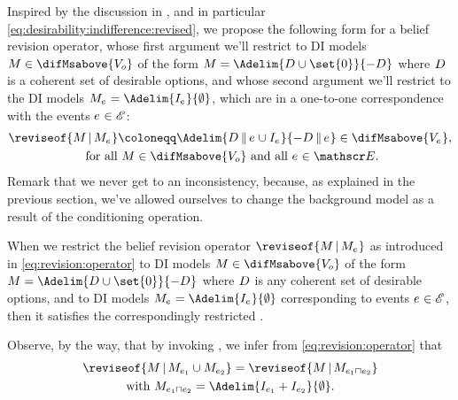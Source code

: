 \documentclass[preprint]{isipta2025}
\begin{document}
Inspired by the discussion in , and in particular \cref{eq:desirability:indifference:revised}, we propose the following form for a belief revision operator, whose first argument we'll restrict to DI models \(\M\in\difMsabove{\zeroM}\) of the form \(\M=\Adelim{\desirset\cup\set{0}}{-\desirset}\) where \(D_{}\) is a coherent set of desirable options, and whose second argument we'll restrict to the DI models \(\eventM=\Adelim{\eventindifset}{\emptyset}\), which are in a one-to-one correspondence with the events \(e_{}\in\mathscr{E}\):
\begin{multline}\label{eq:revision:operator}
\reviseof{\M\given\eventM}
\coloneqq\Adelim{\desirset\altcondon\eventopt\cup\eventindifset}{-\desirset\altcondon\eventopt}\in\difMsabove{\eventbgM},\\
\text{ for all \(\M\in\difMsabove{\zeroM}\) and all \(\eventopt\in\eventopts\)}.
\end{multline}
Remark that we never get to an inconsistency, because, as explained in the previous section, we've allowed ourselves to change the background model as a result of the conditioning operation.

\begin{proposition}\label{prop:revision}
When we restrict the belief revision operator \(\reviseof{\M\given\eventM}\) as introduced in \cref{eq:revision:operator} to DI models \(\M\in\difMsabove{\zeroM}\) of the form \(\M=\Adelim{\desirset\cup\set{0}}{-\desirset}\) where \(D_{}\) is any coherent set of desirable options, and to DI models \(\eventM=\Adelim{\eventindifset}{\emptyset}\) corresponding to events \(e_{}\in\mathscr{E}\), then it satisfies the correspondingly restricted .
\end{proposition}
\noindent Observe, by the way, that by invoking , we infer from \cref{eq:revision:operator} that
\begin{multline*}
\reviseof{\M\given\indexedeventM[1]\cup\indexedeventM[2]}
=\reviseof{\M\given\M_{\eventopt[1]\sqcap\eventopt[2]}}\\
\text{with \(\M_{\eventopt[1]\sqcap\eventopt[2]}=\Adelim{\eventindifset[1]+\eventindifset[2]}{\emptyset}\).}
\end{multline*}
\end{document}
